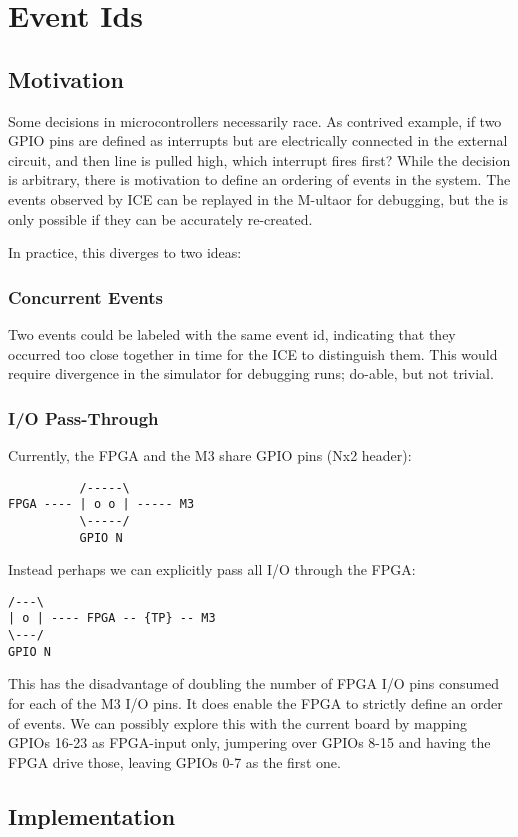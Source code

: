 \documentclass{article}
\begin{document}
\clearpage
\section{Event Ids}
\label{sec:ids}

\subsection{Motivation}
Some decisions in microcontrollers necessarily race. As contrived example, if
two GPIO pins are defined as interrupts but are electrically connected in the
external circuit, and then line is pulled high, which interrupt fires first?
While the decision is arbitrary, there is motivation to define an ordering of
events in the system. The events observed by ICE can be replayed in the
M-ultaor for debugging, but the is only possible if they can be accurately
re-created.

In practice, this diverges to two ideas:

\subsubsection{Concurrent Events}
Two events could be labeled with the same event id, indicating that they
occurred too close together in time for the ICE to distinguish them. This
would require divergence in the simulator for debugging runs; do-able, but not
trivial.

\subsubsection{I/O Pass-Through}
\label{sec:pass-through}
Currently, the FPGA and the M3 share GPIO pins (Nx2 header):
\begin{verbatim}
          /-----\
FPGA ---- | o o | ----- M3
          \-----/
          GPIO N
\end{verbatim}
Instead perhaps we can explicitly pass all I/O through the FPGA:
\begin{verbatim}
/---\
| o | ---- FPGA -- {TP} -- M3
\---/
GPIO N
\end{verbatim}
This has the disadvantage of doubling the number of FPGA I/O pins consumed for
each of the M3 I/O pins. It does enable the FPGA to strictly define an order
of events. We can possibly explore this with the current board by mapping
GPIOs 16-23 as FPGA-input only, jumpering over GPIOs 8-15 and having the FPGA
drive those, leaving GPIOs 0-7 as the first one.

\subsection{Implementation}
\end{document}
